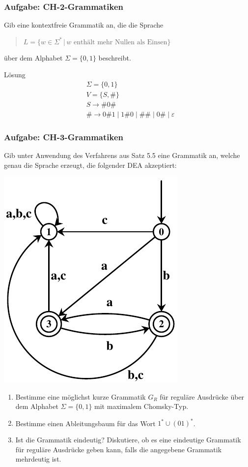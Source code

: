 \begin{frame}
\frametitle{Aufgabe: CH-2-Grammatiken}
Gib eine kontextfreie Grammatik an, die die Sprache
\begin{quote}
  $L = \{w \in \Sigma^* \, | \, w \text{ enth\"alt mehr Nullen als Einsen}\}$  
\end{quote}
\"uber dem Alphabet $\Sigma = \{0, 1\}$ beschreibt.

\invincible
\pause
\begin{block}{Lösung}
\begin{align*}
&\Sigma = \{ 0, 1 \} \\
&V = \{ S, \# \} \\
&S \rightarrow \#0\# \\
&\# \rightarrow 0\#1 \mid 1\#0 \mid \#\# \mid 0\# \mid \varepsilon
\end{align*}
\end{block}
\vincible
\end{frame}


\begin{frame}
\frametitle{Aufgabe: CH-3-Grammatiken}
Gib unter Anwendung des Verfahrens aus Satz 5.5 eine Grammatik an,
welche genau die Sprache erzeugt, die folgender DEA akzeptiert:

\begin{center}\includegraphics[scale=0.8]{./images/dea1.pdf}\end{center}
\end{frame}


\begin{frame}
\begin{enumerate}
\item Bestimme eine möglichst kurze Grammatik $G_R$ für reguläre Ausdrücke über dem Alphabet $\Sigma = \{0,1\}$ mit maximalem Chomsky-Typ.
\item Bestimme einen Ableitungsbaum für das Wort $1^* \cup (01)^*$. 
\item Ist die Grammatik eindeutig? Diskutiere, ob es eine eindeutige Grammatik für reguläre Ausdrücke geben kann, falls die angegebene Grammatik mehrdeutig ist.
\end{enumerate}
\end{frame}

